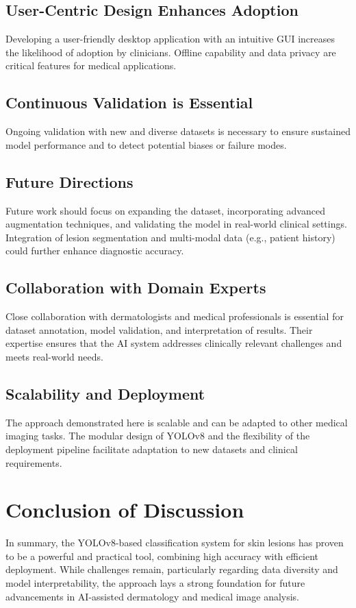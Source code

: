 \documentclass[a4paper,12pt]{report}
\begin{document}
\begin{spacing}{1.5}
        \subsection*{User-Centric Design Enhances Adoption}
        Developing a user-friendly desktop application with an intuitive GUI increases the likelihood of adoption by clinicians. Offline capability and data privacy are critical features for medical applications.
        
        \subsection*{Continuous Validation is Essential}
        Ongoing validation with new and diverse datasets is necessary to ensure sustained model performance and to detect potential biases or failure modes.
        
        \subsection*{Future Directions}
        Future work should focus on expanding the dataset, incorporating advanced augmentation techniques, and validating the model in real-world clinical settings. Integration of lesion segmentation and multi-modal data (e.g., patient history) could further enhance diagnostic accuracy.
        
        \subsection*{Collaboration with Domain Experts}
        Close collaboration with dermatologists and medical professionals is essential for dataset annotation, model validation, and interpretation of results. Their expertise ensures that the AI system addresses clinically relevant challenges and meets real-world needs.
        
        \subsection*{Scalability and Deployment}
        The approach demonstrated here is scalable and can be adapted to other medical imaging tasks. The modular design of YOLOv8 and the flexibility of the deployment pipeline facilitate adaptation to new datasets and clinical requirements.
    
    \section*{Conclusion of Discussion}
    In summary, the YOLOv8-based classification system for skin lesions has proven to be a powerful and practical tool, combining high accuracy with efficient deployment. While challenges remain, particularly regarding data diversity and model interpretability, the approach lays a strong foundation for future advancements in AI-assisted dermatology and medical image analysis.


\end{spacing}
\end{document}
